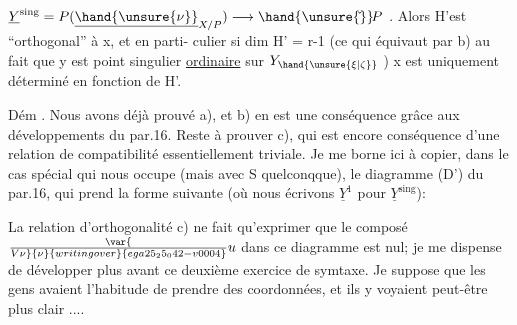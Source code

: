 
$\underline{Y}^{\mathrm{sing}} = P(\underline{\hand{\unsure{\nu}}}_{X/P}) \longrightarrow \hand{\unsure{\check{}}}\!P$ . Alors H'est ``orthogonal'' à x, et en parti-%
culier si dim H' = r-1 (ce qui équivaut par b) au fait que  
y est point  singulier \uline{ordinaire} sur $Y_{\hand{\unsure{\xi|\zeta}}}$ ) x est uniquement déterminé
en fonction de H'.

Dém . Nous avons déjà prouvé a), et b) en est une conséquence
grâce aux développements du par.16. Reste à prouver c), qui est
encore conséquence d'une relation de compatibilité essentiellement
triviale. Je me borne ici à copier, dans le cas spécial qui nous
occupe (mais avec S quelconqque), le diagramme (D') du par.16, qui
prend la forme suivante (où nous écrivons $\underline{Y}^1$ pour $\underline{Y}^{\mathrm{sing}}$):


La relation d'orthogonalité c) ne fait qu'exprimer que le composé
$\var{\over{V}{\nu}}{\nu}{writing over}{ega25_25_042-v0004}u$ dans ce diagramme est nul; je me dispense de développer plus
avant ce deuxième exercice de symtaxe. Je suppose que les gens avaient
l'habitude de prendre des coordonnées, et ils y voyaient peut-être plus
clair ....

